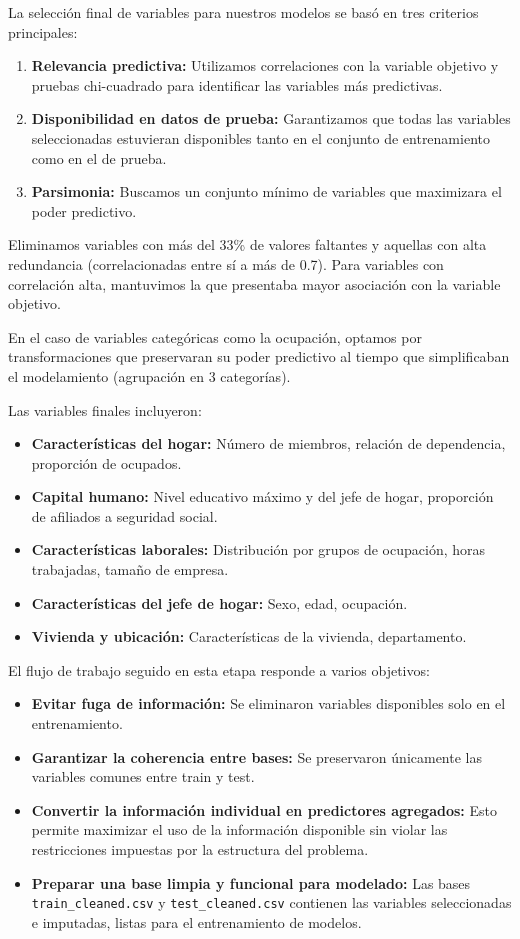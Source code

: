 \documentclass[12pt,a4paper,onecolumn]{article}
\begin{document}
La selección final de variables para nuestros modelos se basó en tres criterios principales:

\begin{enumerate}
    \item \textbf{Relevancia predictiva:} Utilizamos correlaciones con la variable objetivo y pruebas chi-cuadrado para identificar las variables más predictivas.
    \item \textbf{Disponibilidad en datos de prueba:} Garantizamos que todas las variables seleccionadas estuvieran disponibles tanto en el conjunto de entrenamiento como en el de prueba.
    \item \textbf{Parsimonia:} Buscamos un conjunto mínimo de variables que maximizara el poder predictivo.
\end{enumerate}

Eliminamos variables con más del 33\% de valores faltantes y aquellas con alta redundancia (correlacionadas entre sí a más de 0.7). Para variables con correlación alta, mantuvimos la que presentaba mayor asociación con la variable objetivo.

En el caso de variables categóricas como la ocupación, optamos por transformaciones que preservaran su poder predictivo al tiempo que simplificaban el modelamiento (agrupación en 3 categorías).

Las variables finales incluyeron:
\begin{itemize}
    \item \textbf{Características del hogar:} Número de miembros, relación de dependencia, proporción de ocupados.
    \item \textbf{Capital humano:} Nivel educativo máximo y del jefe de hogar, proporción de afiliados a seguridad social.
    \item \textbf{Características laborales:} Distribución por grupos de ocupación, horas trabajadas, tamaño de empresa.
    \item \textbf{Características del jefe de hogar:} Sexo, edad, ocupación.
    \item \textbf{Vivienda y ubicación:} Características de la vivienda, departamento.
\end{itemize}

El flujo de trabajo seguido en esta etapa responde a varios objetivos:

\begin{itemize}
    \item \textbf{Evitar fuga de información:} Se eliminaron variables disponibles solo en el entrenamiento.
    \item \textbf{Garantizar la coherencia entre bases:} Se preservaron únicamente las variables comunes entre train y test.
    \item \textbf{Convertir la información individual en predictores agregados:} Esto permite maximizar el uso de la información disponible sin violar las restricciones impuestas por la estructura del problema.
    \item \textbf{Preparar una base limpia y funcional para modelado:} Las bases \texttt{train\_cleaned.csv} y \texttt{test\_cleaned.csv} contienen las variables seleccionadas e imputadas, listas para el entrenamiento de modelos.
\end{itemize}
\end{document}
